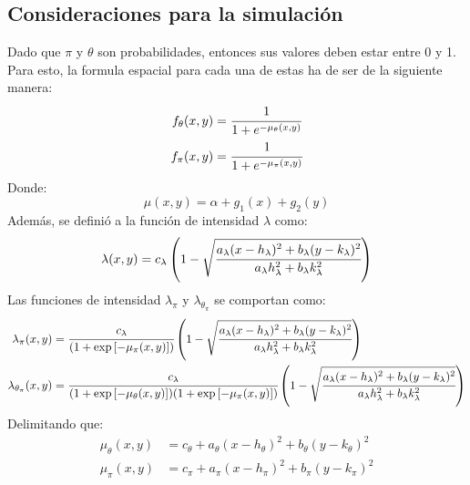 \subsection{Consideraciones para la simulación}\label{ConsiSimu}

Dado que $\pi$ y $\theta$ son probabilidades, entonces sus valores deben estar entre 0 y 1. Para esto, la formula espacial para cada una de estas ha de ser de la siguiente manera:
\begin{align*}
	f_\theta(x,y) &= \cfrac{1}{1+e^{-\mu_\theta(x,y)}}\\
	f_\pi(x,y) &= \cfrac{1}{1+e^{-\mu_\pi(x,y)}}
\end{align*}
Donde:
\begin{equation*}
	\mu(x,y) = \alpha + g_1(x) + g_2(y)
\end{equation*}
Además, se definió a la función de intensidad $\lambda$ como:
\begin{equation*}
    \lambda(x,y) = c_\lambda \left(1 - \sqrt{\cfrac{a_\lambda(x-h_\lambda)^2 + b_\lambda(y-k_\lambda)^2}{a_\lambda h_\lambda^2+b_\lambda k_\lambda^2}} \right)
\end{equation*}
Las funciones de intensidad $\lambda_\pi$ y $\lambda_{\theta_\pi}$ se comportan como:
\begin{align*}
	\lambda_{\pi}(x,y) &= \cfrac{c_\lambda}{(1+\exp{\left[-\mu_\pi(x,y) \right]})} \left(1 - \sqrt{\cfrac{a_\lambda(x-h_\lambda)^2 + b_\lambda(y-k_\lambda)^2}{a_\lambda h_\lambda^2+b_\lambda k_\lambda^2}} \right)\\
	\lambda_{\theta_\pi}(x,y) &= \cfrac{c_\lambda}{(1+\exp{\left[-\mu_\theta(x,y) \right]})(1+\exp{\left[-\mu_\pi(x,y) \right]})} \left(1 - \sqrt{\cfrac{a_\lambda(x-h_\lambda)^2 + b_\lambda(y-k_\lambda)^2}{a_\lambda h_\lambda^2+b_\lambda k_\lambda^2}} \right)
\end{align*}
Delimitando que:
\begin{align*}
	\mu_\theta(x,y) &= c_\theta + a_\theta(x-h_\theta)^2 + b_\theta(y-k_\theta)^2\\
	\mu_\pi(x,y) &= c_\pi + a_\pi(x-h_\pi)^2 + b_\pi(y-k_\pi)^2
\end{align*}

